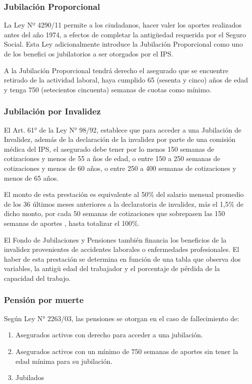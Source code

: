 \subsubsection{Jubilación Proporcional}

La Ley Nº 4290/11 permite a los ciudadanos, hacer valer los aportes
realizados antes del año 1974, a efectos de completar la antigüedad
requerida por el Seguro Social. Esta Ley adicionalmente introduce la
Jubilación Proporcional como uno de los benefici os jubilatorios a ser
otorgados por el IPS.

A la Jubilación Proporcional tendrá derecho el asegurado que se
encuentre retirado de la actividad laboral, haya cumplido 65 (sesenta y
cinco) años de edad y tenga 750 (setecientos cincuenta) semanas de
cuotas como mínimo.

\subsubsection{Jubilación por Invalidez}

El Art. 61° de la Ley N° 98/92, establece que para acceder a una
Jubilación de Invalidez, además de la declaración de la invalidez por
parte de una comisión médica del IPS, el asegurado debe tener por lo
menos 150 semanas de cotizaciones y menos de 55 a ños de edad, o entre
150 a 250 semanas de cotizaciones y menos de 60 años, o entre 250 a 400
semanas de cotizaciones y menos de 65 años.

El monto de esta prestación es equivalente al 50\% del salario mensual
promedio de los 36 últimos meses anteriores a la declaratoria de
invalidez, más el 1,5\% de dicho monto, por cada 50 semanas de
cotizaciones que sobrepasen las 150 semanas de aportes , hasta totalizar
el 100\%.

El Fondo de Jubilaciones y Pensiones también financia los beneficios de
la invalidez provenientes de accidentes laborales o enfermedades
profesionales. El haber de esta prestación se determina en función de
una tabla que observa dos variables, la antigü edad del trabajador y el
porcentaje de pérdida de la capacidad del trabajo.

\subsubsection{Pensión por muerte}

Según Ley N° 2263/03, las pensiones se otorgan en el caso de
fallecimiento de:

\begin{enumerate}[label=\alph*.]

\item Asegurados activos con derecho para acceder a una jubilación.

\item Asegurados activos con un mínimo de 750 semanas de aportes sin tener la edad mínima para su jubilación. 

\item Jubilados

\end{enumerate}

